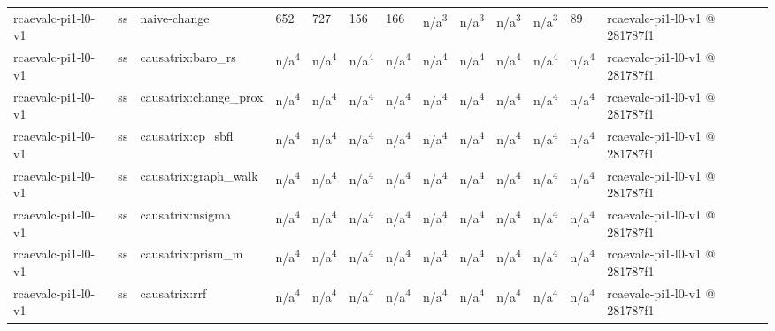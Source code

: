 \begin{table}[t]
\begin{tabular}{lllllllllllll}
rcaevalc-pi1-l0-v1 & ss & naive-change & 652 & 727 & 156 & 166 & n/a\textsuperscript{3} & n/a\textsuperscript{3} & n/a\textsuperscript{3} & n/a\textsuperscript{3} & 89 & rcaevalc-pi1-l0-v1 @ 281787f1 \\
rcaevalc-pi1-l0-v1 & ss & causatrix:baro\_rs & n/a\textsuperscript{4} & n/a\textsuperscript{4} & n/a\textsuperscript{4} & n/a\textsuperscript{4} & n/a\textsuperscript{4} & n/a\textsuperscript{4} & n/a\textsuperscript{4} & n/a\textsuperscript{4} & n/a\textsuperscript{4} & rcaevalc-pi1-l0-v1 @ 281787f1 \\
rcaevalc-pi1-l0-v1 & ss & causatrix:change\_prox & n/a\textsuperscript{4} & n/a\textsuperscript{4} & n/a\textsuperscript{4} & n/a\textsuperscript{4} & n/a\textsuperscript{4} & n/a\textsuperscript{4} & n/a\textsuperscript{4} & n/a\textsuperscript{4} & n/a\textsuperscript{4} & rcaevalc-pi1-l0-v1 @ 281787f1 \\
rcaevalc-pi1-l0-v1 & ss & causatrix:cp\_sbfl & n/a\textsuperscript{4} & n/a\textsuperscript{4} & n/a\textsuperscript{4} & n/a\textsuperscript{4} & n/a\textsuperscript{4} & n/a\textsuperscript{4} & n/a\textsuperscript{4} & n/a\textsuperscript{4} & n/a\textsuperscript{4} & rcaevalc-pi1-l0-v1 @ 281787f1 \\
rcaevalc-pi1-l0-v1 & ss & causatrix:graph\_walk & n/a\textsuperscript{4} & n/a\textsuperscript{4} & n/a\textsuperscript{4} & n/a\textsuperscript{4} & n/a\textsuperscript{4} & n/a\textsuperscript{4} & n/a\textsuperscript{4} & n/a\textsuperscript{4} & n/a\textsuperscript{4} & rcaevalc-pi1-l0-v1 @ 281787f1 \\
rcaevalc-pi1-l0-v1 & ss & causatrix:nsigma & n/a\textsuperscript{4} & n/a\textsuperscript{4} & n/a\textsuperscript{4} & n/a\textsuperscript{4} & n/a\textsuperscript{4} & n/a\textsuperscript{4} & n/a\textsuperscript{4} & n/a\textsuperscript{4} & n/a\textsuperscript{4} & rcaevalc-pi1-l0-v1 @ 281787f1 \\
rcaevalc-pi1-l0-v1 & ss & causatrix:prism\_m & n/a\textsuperscript{4} & n/a\textsuperscript{4} & n/a\textsuperscript{4} & n/a\textsuperscript{4} & n/a\textsuperscript{4} & n/a\textsuperscript{4} & n/a\textsuperscript{4} & n/a\textsuperscript{4} & n/a\textsuperscript{4} & rcaevalc-pi1-l0-v1 @ 281787f1 \\
rcaevalc-pi1-l0-v1 & ss & causatrix:rrf & n/a\textsuperscript{4} & n/a\textsuperscript{4} & n/a\textsuperscript{4} & n/a\textsuperscript{4} & n/a\textsuperscript{4} & n/a\textsuperscript{4} & n/a\textsuperscript{4} & n/a\textsuperscript{4} & n/a\textsuperscript{4} & rcaevalc-pi1-l0-v1 @ 281787f1 \\

\end{tabular}
\end{table}
